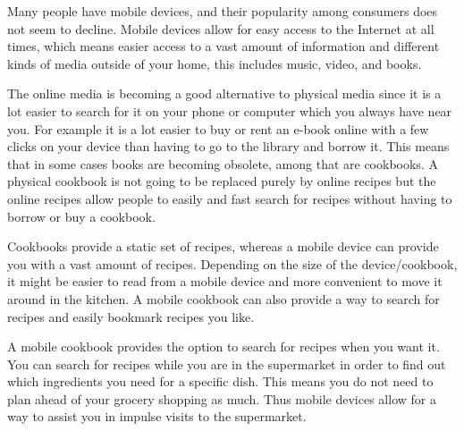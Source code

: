Many people have mobile devices, and their popularity among consumers does not seem to decline\citep{mobilegrow}. Mobile devices allow for easy access to the Internet at all times, which means easier access to a vast amount of information and different kinds of media outside of your home, this includes music, video, and books.

The online media is becoming a good alternative to physical media since it is a lot easier to search for it on your phone or computer which you always have near you. 
For example it is a lot easier to buy or rent an e-book online with a few clicks on your device than having to go to the library and borrow it. 
This means that in some cases books are becoming obsolete, among that are cookbooks. 
A physical cookbook is not going to be replaced purely by online recipes but the online recipes allow people to easily and fast search for recipes without having to borrow or buy a cookbook.

Cookbooks provide a static set of recipes, whereas a mobile device can provide you with a vast amount of recipes. Depending on the size of the device/cookbook, it might be easier to read from a mobile device and more convenient to move it around in the kitchen. A mobile cookbook can also provide a way to search for recipes and easily bookmark recipes you like.

A mobile cookbook provides the option to search for recipes when you want it. You can search for recipes while you are in the supermarket in order to find out which ingredients you need for a specific dish. This means you do not need to plan ahead of your grocery shopping as much. Thus mobile devices allow for a way to assist you in impulse visits to the supermarket.
